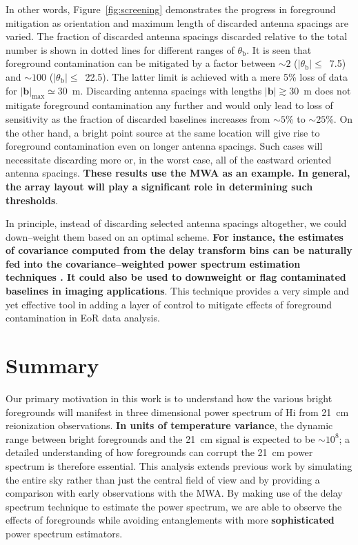 \documentclass[preprint2,iop,numberedappendix]{emulateapj}
\begin{document}
In other words, Figure~\ref{fig:screening} demonstrates the progress in foreground mitigation as orientation and maximum length of discarded antenna spacings are varied. The fraction of discarded antenna spacings discarded relative to the total number is shown in dotted lines for different ranges of $\theta_\textrm{b}$. It is seen that foreground contamination can be mitigated by a factor between $\sim 2$ ($|\theta_\textrm{b}|\le$~7.5\arcdeg) and $\sim 100$ ($|\theta_\textrm{b}|\le$~22.5\arcdeg). The latter limit is achieved with a mere 5\% loss of data for $|\boldsymbol{b}|_\textrm{max}\simeq30$~m. Discarding antenna spacings with lengths $|\boldsymbol{b}|\gtrsim 30$~m does not mitigate foreground contamination any further and would only lead to loss of sensitivity as the fraction of discarded baselines increases from $\sim 5$\% to $\sim 25$\%. On the other hand, a bright point source at the same location will give rise to foreground contamination even on longer antenna spacings. Such cases will necessitate discarding more or, in the worst case, all of the eastward oriented antenna spacings. {\bf These results use the MWA as an example. In general, the array layout will play a significant role in determining such thresholds}.

In principle, instead of discarding selected antenna spacings altogether, we could down--weight them based on an optimal scheme. {\bf For instance, the estimates of covariance computed from the delay transform bins can be naturally fed into the covariance--weighted power spectrum estimation techniques \citep{liu14a,liu14b}. It could also be used to downweight or flag contaminated baselines in imaging applications}. This technique provides a very simple and yet effective tool in adding a layer of control to mitigate effects of foreground contamination in EoR data analysis. 

\section{Summary}\label{sec:summary}

Our primary motivation in this work is to understand how the various bright foregrounds will manifest in three dimensional power spectrum of H{\sc i} from 21~cm reionization observations. {\bf In units of temperature variance}, the dynamic range between bright foregrounds and the 21~cm signal is expected to be $\sim 10^8$; a detailed understanding of how foregrounds can corrupt the 21~cm power spectrum is therefore essential. This analysis extends previous work by simulating the entire sky rather than just the central field of view and by providing a comparison with early observations with the MWA. By making use of the delay spectrum technique to estimate the power spectrum, we are able to observe the effects of foregrounds while avoiding entanglements with more {\bf sophisticated} power spectrum estimators.  
\end{document}

